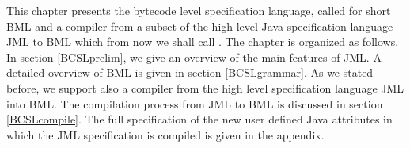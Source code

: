 
%

\newcommand{\code}{\textit{code}}
\newcommand{\indexComp}{\textit{index}}





This chapter presents the bytecode level specification language, called for short BML and a compiler from a
 subset of the high level Java specification language JML to BML which from now we shall call \JMLtoBML. 
The chapter is organized as follows.
 In section \ref{BCSLprelim}, we give an overview of the main features of JML. A detailed overview of BML is given in section \ref{BCSLgrammar}.  
  As we stated before, we support also a compiler from the high level specification language JML into BML. The 
 compilation process from JML to BML is discussed in section  \ref{BCSLcompile}.
 The full specification of the new user defined Java attributes in which the JML specification is compiled is given in the appendix.




